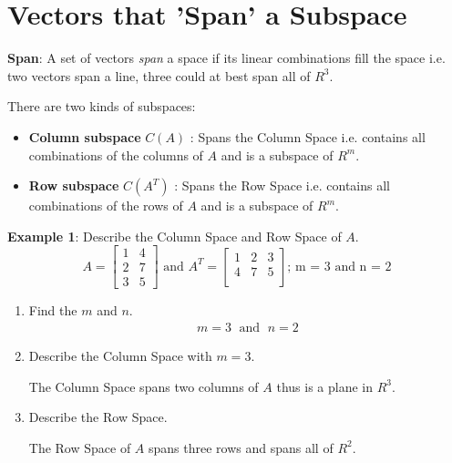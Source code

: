 \documentclass[10pt,a4paper]{article}
\begin{document}
\section{Vectors that 'Span' a Subspace}

\begin{tcolorbox}[breakable,colback=white,colframe=black,width=\dimexpr\textwidth+12mm\relax,enlarge left by=-6mm]
\textbf{Span}: A set of vectors \textit{span} a space if its linear combinations fill the space i.e. two vectors span a line, three could at best span all of $R^3$.
\end{tcolorbox}

There are two kinds of subspaces:
\begin{itemize}
    \item \textbf{Column subspace} $C(A)$ : Spans the Column Space i.e. contains all combinations of the
    columns of $A$ and is a subspace of $R^m$.
    \item \textbf{Row subspace} $C(A^T)$ : Spans the Row Space i.e. contains all combinations of the
    rows of $A$ and is a subspace of $R^m$.
\end{itemize}

\textbf{Example 1}: Describe the Column Space and Row Space of $A$.
\begin{equation*} 
    A=\begin{bmatrix}
        1 & 4 \\ 
        2 & 7 \\ 
        3 & 5 
        \end{bmatrix} \textrm{ and } A^T=\begin{bmatrix}
            1 & 2 & 3 \\ 
            4 & 7 & 5\\ 
            \end{bmatrix} \textrm{; m = 3 and n = 2}
\end{equation*}
\begin{enumerate}
    \item Find the $m$ and $n$.
    \begin{align*}
        m = 3 \; \text{ and } \; n=2
    \end{align*}
    \item Describe the Column Space with $m=3$.
    
    The Column Space spans two columns of $A$ thus is a plane in $R^3$.

    \item Describe the Row Space.
    
    The Row Space of $A$ spans three rows and spans all of $R^2$.
\end{enumerate}
\end{document}
